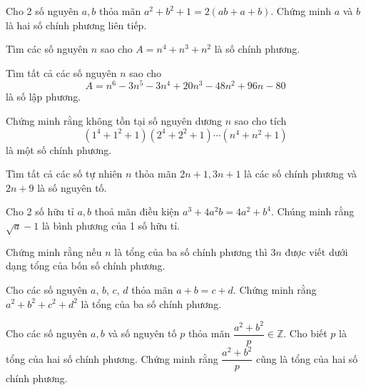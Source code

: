 \begin{btt}
Cho 2 số nguyên ${a}, {b}$ thỏa mãn ${a}^{2}+{b}^{2}+1=2({ab}+{a}+{b})$. Chứng minh $a$ và $b$ là
hai số chính phương liên tiếp.
\end{btt}

\begin{btt}
Tìm các số nguyên $n$ sao cho $A=n^{4}+n^{3}+n^{2}$ là số chính phương.
\end{btt}

\begin{btt}
Tìm tất cả các số nguyên $n$ sao cho $$A=n^6-3n^5-3n^4+20n^3-48n^2+96n-80$$ là số lập phương.
\end{btt}

\begin{btt}
Chứng minh rằng không tồn tại số nguyên dương $n$ sao cho tích
$$\left(1^4+1^2+1\right)\left(2^4+2^2+1\right)\cdots\left(n^4+n^2+1\right)$$
là một số chính phương.
\end{btt}

\begin{btt}
Tìm tất cả các số tự nhiên $n$ thỏa mãn $2 n+1,3 n+1$ là các số chính phương và $2n+9$ là số nguyên tố. 
\end{btt}

\begin{btt}
Cho 2 số hữu tỉ $a, b$ thoả mãn điều kiện $a^{3}+4 a^{2} b=4 a^{2}+b^{4}$. Chúng minh rằng $\sqrt{a}-1$ là bình phương của 1 số hữu tỉ.
\end{btt}

\begin{btt}
Chứng minh rằng nếu $n$ là tổng của ba số chính phương thì $3n$ được viết dưới dạng tổng của bốn số chính phương.
\end{btt}

\begin{btt}
Cho các số nguyên $a$, $b$, $c$, $d$ thỏa mãn $a + b = c + d$. Chứng minh rằng $a^2 + b^2 + c^2 + d^2$ là tổng của ba số chính phương.
\end{btt}

\begin{btt}
 Cho các số nguyên ${a}, {b}$ và số nguyên tố ${p}$ thỏa mãn $\dfrac{{a}^{2}+{b}^{2}}{{p}} \in \mathbb{Z}$. Cho biết ${p}$ là
tổng của hai số chính phương. Chứng minh rằng $\dfrac{{a}^{2}+{b}^{2}}{{p}}$ cũng là tổng của hai số chính phương.
\end{btt}


